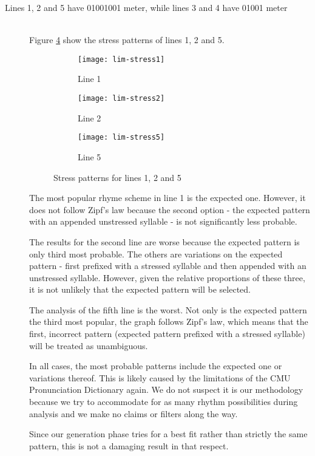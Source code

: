 \begin{description}
\item[Lines 1, 2 and 5 have 01001001 meter, while lines 3 and 4 have 01001 meter]  \hfill \\
Figure \ref{fig:lim3} show the stress patterns of lines 1, 2 and 5.

\begin{figure}[H]
\centering
\begin{subfigure}[t]{0.5\textwidth}
	\centering
    \texttt{[image: lim-stress1]}
    \caption{Line 1}
    \label{fig:lim-stress1}
\end{subfigure}
\begin{subfigure}[t]{0.5\textwidth}
	\centering
    \texttt{[image: lim-stress2]}
    \caption{Line 2}
    \label{fig:lim-stress2}
\end{subfigure}
\begin{subfigure}[t]{0.9\textwidth}
	\centering
    \texttt{[image: lim-stress5]}
    \caption{Line 5}
    \label{fig:lim-stress5}
\end{subfigure}
\caption{Stress patterns for lines 1, 2 and 5}
\label{fig:lim3}
\end{figure}

The most popular rhyme scheme in line 1 is the expected one. However, it does not follow Zipf's law because the second option - the expected pattern with an appended unstressed syllable - is not significantly less probable.

The results for the second line are worse because the expected pattern is only third most probable. The others are variations on the expected pattern - first prefixed with a stressed syllable and then appended with an unstressed syllable. However, given the relative proportions of these three, it is not unlikely that the expected pattern will be selected.

The analysis of the fifth line is the worst. Not only is the expected pattern the third most popular, the graph follows Zipf's law, which means that the first, incorrect pattern (expected pattern prefixed with a stressed syllable) will be treated as unambiguous.

In all cases, the most probable patterns include the expected one or variations thereof. This is likely caused by the limitations of the CMU Pronunciation Dictionary again. We do not suspect it is our methodology because we try to accommodate for as many rhythm possibilities during analysis and we make no claims or filters along the way. 

Since our generation phase tries for a best fit rather than strictly the same pattern, this is not a damaging result in that respect.


\end{description}
